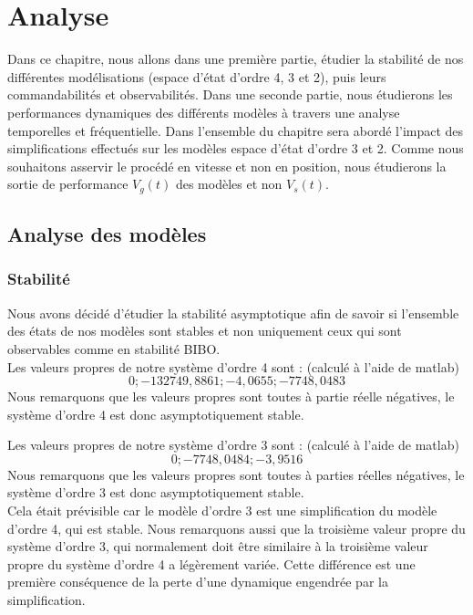 \chapter{Analyse}
\label{chap:analyse}
Dans ce chapitre, nous allons dans une première partie, étudier la stabilité de nos différentes modélisations (espace d'état d'ordre 4, 3 et 2), puis leurs commandabilités et observabilités. Dans une seconde partie, nous étudierons les performances dynamiques des différents modèles à travers une analyse temporelles et fréquentielle. Dans l'ensemble du chapitre sera abordé l'impact des simplifications effectués sur les modèles espace d'état d'ordre 3 et 2.
Comme nous souhaitons asservir le procédé en vitesse et non en position, nous étudierons la sortie de performance $V_g(t)$ des modèles  et non $V_s(t)$. 

\section{Analyse des modèles}
\subsection{Stabilité}
Nous avons décidé d'étudier la stabilité asymptotique afin de savoir si l'ensemble des états de nos modèles sont stables et non uniquement ceux qui sont observables comme en stabilité BIBO. \\

\noindent Les valeurs propres de notre système d'ordre 4 sont : (calculé à l'aide de matlab)\\
\begin{equation}
{0 ; -132749,8861 ; -4,0655 ; -7748,0483 }
\end{equation}
Nous remarquons que les valeurs propres sont toutes à partie réelle négatives, le système d'ordre 4 est donc asymptotiquement stable.

\noindent Les valeurs propres de notre système d'ordre 3 sont : (calculé à l'aide de matlab)\\
\begin{equation}
{ 0 ; -7748,0484 ; -3,9516 }
\end{equation}
Nous remarquons que les valeurs propres sont toutes à parties réelles négatives, le système d'ordre 3 est donc asymptotiquement stable.\\

Cela était prévisible car le modèle d'ordre 3 est une simplification du modèle d'ordre 4, qui est stable. Nous remarquons aussi que la troisième valeur propre du système d'ordre 3, qui normalement doit être similaire à la troisième valeur propre du système d'ordre 4 a légèrement variée. Cette différence est une première conséquence de la perte d'une dynamique engendrée par la simplification.

